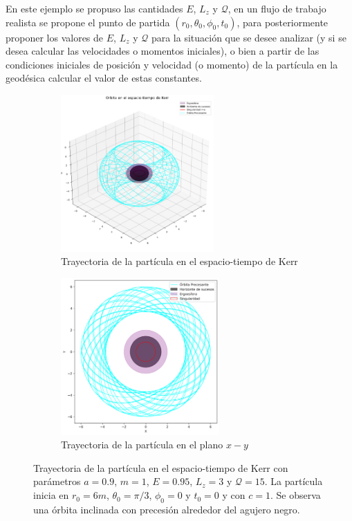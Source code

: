 En este ejemplo se propuso las cantidades $E$, $L_z$ y $\mathcal{Q}$, en un flujo de trabajo realista se propone el punto de partida  $(r_0, \theta_0, \phi_0, t_0)$, para posteriormente proponer los valores de $E$, $L_z$ y $\mathcal{Q}$ para la situación que se desee analizar (y si se desea calcular las velocidades o momentos iniciales), o bien a partir de las condiciones iniciales de posición y velocidad (o momento) de la partícula en la geodésica calcular el valor de estas constantes.

\begin{figure}[H]
\begin{subfigure}{0.5\textwidth}
\includegraphics[width=0.9\linewidth, height=6cm]{AgujerosNegros/kerr/geodesics_plots/Geodesica1.png} 
\caption{Trayectoria de la partícula en el espacio-tiempo de Kerr}
\end{subfigure}
\begin{subfigure}{0.5\textwidth}
\includegraphics[width=0.9\linewidth, height=6cm]{AgujerosNegros/kerr/geodesics_plots/Geodesica1_planoxy.png}
\caption{Trayectoria de la partícula en el plano $x-y$}
\end{subfigure}
\caption{Trayectoria de la partícula en el espacio-tiempo de Kerr con parámetros $a=0.9$, $m=1$, $E=0.95$, $L_z=3$ y $\mathcal{Q}=15$. La partícula inicia en $r_0=6m$, $\theta_0=\pi/3$, $\phi_0=0$ y $t_0=0$ y con $c = 1$. Se observa una órbita inclinada con precesión alrededor del agujero negro.}
\end{figure}

